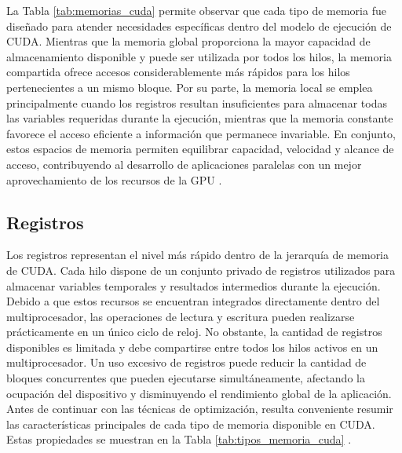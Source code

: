 La Tabla \ref{tab:memorias_cuda} permite observar que cada tipo de memoria fue diseñado para atender necesidades específicas dentro del modelo de ejecución de CUDA. Mientras que la memoria global proporciona la mayor capacidad de almacenamiento disponible y puede ser utilizada por todos los hilos, la memoria compartida ofrece accesos considerablemente más rápidos para los hilos pertenecientes a un mismo bloque. Por su parte, la memoria local se emplea principalmente cuando los registros resultan insuficientes para almacenar todas las variables requeridas durante la ejecución, mientras que la memoria constante favorece el acceso eficiente a información que permanece invariable. En conjunto, estos espacios de memoria permiten equilibrar capacidad, velocidad y alcance de acceso, contribuyendo al desarrollo de aplicaciones paralelas con un mejor aprovechamiento de los recursos de la GPU \cite{cudaMemoryHierarchy,nvidiaBestPractices,cornellMemory,nvidiaProgrammingGuide}.

\subsection{Registros}

Los registros representan el nivel más rápido dentro de la jerarquía de memoria de CUDA. Cada hilo dispone de un conjunto privado de registros utilizados para almacenar variables temporales y resultados intermedios durante la ejecución. Debido a que estos recursos se encuentran integrados directamente dentro del multiprocesador, las operaciones de lectura y escritura pueden realizarse prácticamente en un único ciclo de reloj. No obstante, la cantidad de registros disponibles es limitada y debe compartirse entre todos los hilos activos en un multiprocesador. Un uso excesivo de registros puede reducir la cantidad de bloques concurrentes que pueden ejecutarse simultáneamente, afectando la ocupación del dispositivo y disminuyendo el rendimiento global de la aplicación. Antes de continuar con las técnicas de optimización, resulta conveniente resumir las características principales de cada tipo de memoria disponible en CUDA. Estas propiedades se muestran en la Tabla \ref{tab:tipos_memoria_cuda} \cite{cudaMemoryHierarchy,nvidiaProgrammingGuide}.

